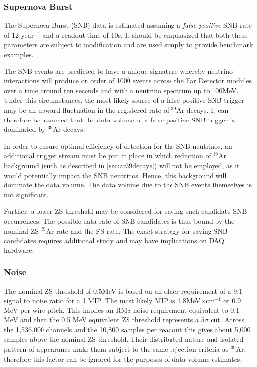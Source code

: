 \subsubsection{Supernova Burst}

The Supernova Burst (SNB) data is estimated assuming a
\textit{false-positive} SNB rate of 12 year$^{-1}$ and a readout time of
10s. It should be emphasized that both these parameters are subject to
modification and are used simply to provide benchmark examples.

The SNB events are predicted to have a unique signature whereby
neutrino interactions will produce on order of 1000 events across
the Far Detector modules over a time around ten seconds and with a
neutrino spectrum up to 100MeV. Under this circumstances, 
the most likely source of a false positive SNB trigger may be an upward
fluctuation in the registered rate of $^{39}$Ar decays.
It can therefore be assumed that the data volume of a
false-positive SNB trigger is dominated by $^{39}$Ar decays.

In order to ensure optimal efficiency of detection for the SNB neutrinos,
an  additional trigger stream must be put in place in which
reduction of $^{39}$Ar background (such as described in \ref{sec:ar39decays}) will not be employed, as it would potentially impact the SNB neutrinos. Hence, this background 
will dominate the data volume. The data volume due to the SNB events themselves is not significant.

Further, a lower ZS threshold may be considered for saving such
candidate SNB occurrences. The possible data rate of SNB candidates is thus bound by the nominal
ZS $^{39}$Ar rate and the FS rate. The exact strategy for saving SNB candidates requires additional study
and may have implications on DAQ hardware.

\subsubsection{Noise}

The nominal ZS threshold of 0.5MeV is based on an older requirement of a
9:1 signal to noise ratio for a 1 MIP. The most likely MIP is 1.8MeV$\times$cm$^{-1}$ or 0.9 MeV per wire pitch.
This implies an RMS noise requirement equivalent to 0.1 MeV and then the 0.5 MeV equivalent ZS
threshold represents a $5\sigma$ cut. Across the 1,536,000 channels and the 10,800 samples
per readout this gives about 5,000 samples above the nominal ZS threshold. Their distributed
nature and isolated pattern of appearance make them subject to the same rejection criteria as
$^{39}$Ar, therefore this factor can be ignored for the purposes of data volume estimates.


